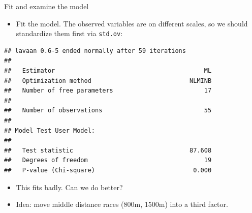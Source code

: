 \documentclass[ignorenonframetext,]{beamer}
\newenvironment{Shaded}{\begin{snugshade}}{\end{snugshade}}
\newcommand{\DataTypeTok}[1]{\textcolor[rgb]{0.13,0.29,0.53}{#1}}
\newcommand{\FloatTok}[1]{\textcolor[rgb]{0.00,0.00,0.81}{#1}}
\newcommand{\KeywordTok}[1]{\textcolor[rgb]{0.13,0.29,0.53}{\textbf{#1}}}
\newcommand{\NormalTok}[1]{#1}
\newcommand{\OperatorTok}[1]{\textcolor[rgb]{0.81,0.36,0.00}{\textbf{#1}}}
\newcommand{\StringTok}[1]{\textcolor[rgb]{0.31,0.60,0.02}{#1}}
\providecommand{\tightlist}{%
  \setlength{\itemsep}{0pt}\setlength{\parskip}{0pt}}
\begin{document}
\begin{frame}[fragile]{Fit and examine the model}
\protect\hypertarget{fit-and-examine-the-model}{}

\begin{itemize}
\tightlist
\item
  Fit the model. The observed variables are on different scales, so we
  should standardize them first via \texttt{std.ov}:
\end{itemize}

\scriptsize

\begin{Shaded}
\end{Shaded}

\begin{verbatim}
## lavaan 0.6-5 ended normally after 59 iterations
## 
##   Estimator                                         ML
##   Optimization method                           NLMINB
##   Number of free parameters                         17
##                                                       
##   Number of observations                            55
##                                                       
## Model Test User Model:
##                                                       
##   Test statistic                                87.608
##   Degrees of freedom                                19
##   P-value (Chi-square)                           0.000
\end{verbatim}

\normalsize

\begin{itemize}
\item
  This fits badly. Can we do better?
\item
  Idea: move middle distance races (800m, 1500m) into a third factor.
\end{itemize}

\end{frame}
\end{document}
